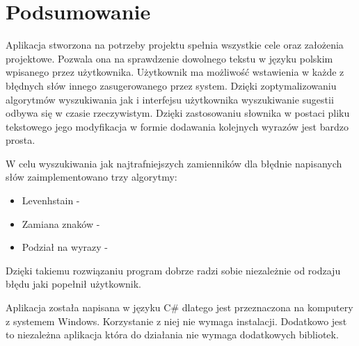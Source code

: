 \chapter{Podsumowanie}

%

Aplikacja stworzona na potrzeby projektu spełnia wszystkie cele oraz założenia projektowe. Pozwala ona na sprawdzenie dowolnego tekstu w języku polskim wpisanego przez użytkownika. Użytkownik ma możliwość wstawienia w każde z błędnych słów innego zasugerowanego przez system. Dzięki zoptymalizowaniu algorytmów wyszukiwania jak i interfejsu użytkownika wyszukiwanie sugestii odbywa się w czasie rzeczywistym. Dzięki zastosowaniu słownika w postaci pliku tekstowego jego modyfikacja w formie dodawania kolejnych wyrazów jest bardzo prosta. 

W celu wyszukiwania jak najtrafniejszych zamienników dla błędnie napisanych słów zaimplementowano trzy algorytmy:
\begin{itemize}
	\item Levenhstain -
	\item Zamiana znaków -
	\item Podział na wyrazy -  
\end{itemize}

Dzięki takiemu rozwiązaniu program dobrze radzi sobie niezależnie od rodzaju błędu jaki popełnił użytkownik.

Aplikacja została napisana w języku C\# dlatego jest przeznaczona na komputery z systemem Windows. Korzystanie z niej nie wymaga instalacji. Dodatkowo jest to niezależna aplikacja która do działania nie wymaga dodatkowych bibliotek.